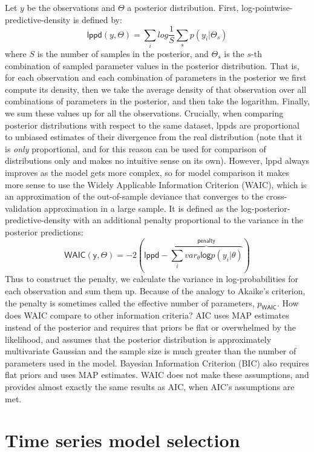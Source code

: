 \documentclass[preprint,12pt]{elsarticle}
\begin{document}
 Let  $y$ be the observations and $\Theta$  a posterior distribution.
First, log-pointwise-predictive-density is defined by:
\[
\mathsf{lppd}(y, \Theta)  = \sum_i log\frac{1}{S}\sum_s p (y_i\vert \Theta_s)
\]
\noindent where $S$ is the number of samples in the posterior, and $\Theta_s$ 
is the $s$-th combination of sampled parameter values in the posterior distribution. That is, 
for each observation and each combination of 
parameters in the posterior we first compute its density, then 
we take the average density of that observation over all combinations of parameters in the posterior,
and  then take the logarithm. Finally, we sum these values up for all the observations. Crucially, when comparing posterior distributions with respect to the same dataset, \textsf{lppd}s are proportional
 to unbiased estimates of their divergence from the real distribution (note that it is \emph{only} 
 proportional, and for this reason can be used for comparison of distributions 
 only and makes no intuitive sense on its own).  However, \textsf{lppd} always improves
  as the model gets more complex, so for model comparison it makes more sense to use 
 the Widely Applicable Information Criterion (WAIC), which is an approximation of the out-of-sample deviance that converges to the cross-validation approximation in a large sample. It  is defined as
 the log-posterior-predictive-density with an additional
  penalty proportional to the variance in the
  posterior predictions:
\[
\mathsf{WAIC(y, \Theta)} = -2 (\mathsf{lppd} - \overbrace{\sum_i var_\theta \mathsf{log} p (y_i \vert \theta)}^{\mathsf{penalty}})
 \]
\noindent  Thus to construct the penalty, we calculate the variance in log-probabilities for each observation and sum them up. Because of the analogy to Akaike's criterion, the penalty is sometimes called the effective number of parameters, $p_{\mathsf{WAIC}}$. 
How does WAIC compare to other information criteria?  AIC uses MAP estimates instead of the posterior and requires that priors be flat or overwhelmed by the likelihood, and assumes that the posterior distribution is approximately multivariate Gaussian and the sample size is  much greater  than the number of parameters used in the model. Bayesian Information Criterion (BIC) also requires flat priors and uses MAP estimates. WAIC does not make these assumptions, and provides almost exactly the same results as AIC, when AIC’s assumptions are met.


\section{Time series model
selection}\label{sec:time-series-model-selection}
\end{document}
